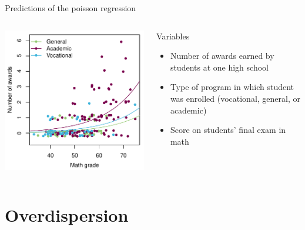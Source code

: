 \documentclass[aspectratio=169]{beamer}
\begin{document}
\begin{frame}{Predictions of the poisson regression}
\begin{columns}[c]
\begin{column}{.5\textwidth}
  \includegraphics[scale=.7]{../figures/pois_pre}
\end{column}
\begin{column}{.5\textwidth}
  Variables
  \begin{itemize}
    \item Number of awards earned by students at one high school
    \item Type of program in which student was enrolled (vocational,
    general, or academic)
    \item Score on students' final exam in math
  \end{itemize}
\end{column}
\end{columns}
\end{frame}

\section{Overdispersion}
\end{document}
